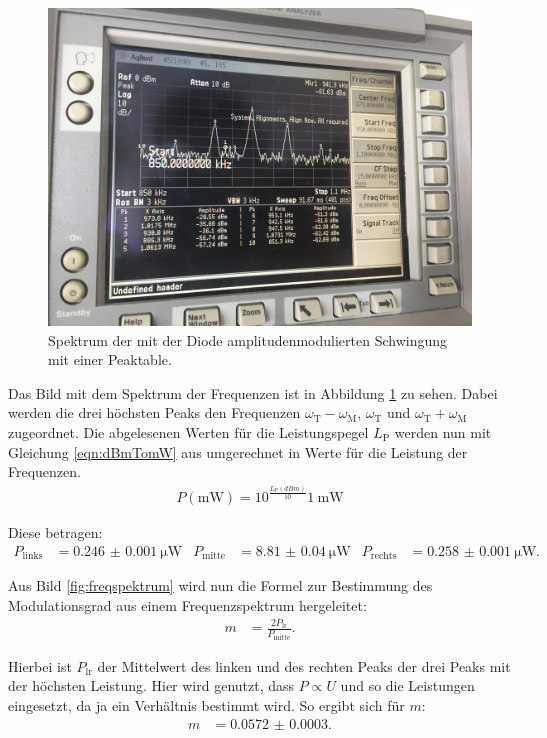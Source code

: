 \begin{figure}[h]
  \centering
  \includegraphics[width=.9\textwidth]{Spektrum_Pics/c.jpg}
  \caption{Spektrum der mit der Diode amplitudenmodulierten Schwingung mit einer Peaktable.}
  \label{fig:c}
\end{figure}

Das Bild mit dem Spektrum der Frequenzen ist in Abbildung \ref{fig:c} zu sehen.
Dabei werden die drei höchsten Peaks den Frequenzen $\omega_\text{T} - \omega_\text{M}$, $\omega_\text{T}$ und $\omega_\text{T} + \omega_\text{M}$ zugeordnet.
Die abgelesenen Werten für die Leistungspegel $L_\text{P}$ werden nun mit Gleichung \eqref{eqn:dBmTomW} aus \cite{leistungspegel} umgerechnet in Werte für die Leistung der Frequenzen.
\begin{align}
  P(\si{\milli\watt}) =
   10^{\frac{L_\text{P}(\si{dBm})}{10}} \SI{1}{\milli\watt} \label{eqn:dBmTomW}
\end{align}

Diese betragen:
\begin{align*}
  P_\text{links} &= \SI{0.246(1)}{\micro\watt} & P_\text{mitte} &= \SI{8.81(4)}{\micro\watt} & P_\text{rechts} &= \SI{0.258(1)}{\micro\watt}.
\end{align*}

Aus Bild \ref{fig:freqspektrum} wird nun die Formel zur Bestimmung des Modulationsgrad aus einem Frequenzspektrum hergeleitet:
\begin{align*}
  m &= \frac{2 P_\text{lr}}{P_\text{mitte}}.
\end{align*}

Hierbei ist $P_\text{lr}$ der Mittelwert des linken und des rechten Peaks der drei Peaks mit der höchsten Leistung. Hier wird genutzt, dass $P \propto U$ und so die Leistungen eingesetzt, da ja ein Verhältnis bestimmt wird.
So ergibt sich für $m$:
\begin{align*}
  m &= \num{0.0572(3)}.
\end{align*}

